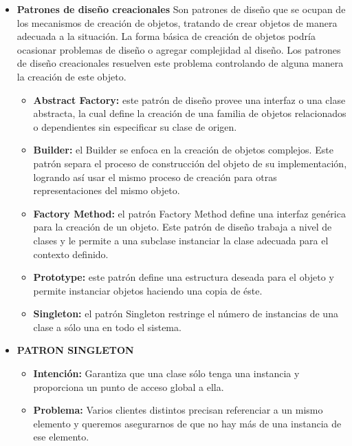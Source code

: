 \documentclass[twoside,twocolumn]{article}
\begin{document}
\begin{itemize}

    \item \textbf{Patrones de diseño creacionales} 
    Son patrones de diseño que se ocupan de los mecanismos de creación de objetos, tratando de crear objetos de manera adecuada a la situación. La forma básica de creación de objetos podría ocasionar problemas de diseño o agregar complejidad al diseño. Los patrones de diseño creacionales resuelven este problema controlando de alguna manera la creación de este objeto.
    \begin{itemize}
		\item \textbf{Abstract Factory:}	este patrón de diseño provee una interfaz o una clase abstracta, la cual define la creación de una familia de objetos relacionados o dependientes sin especificar su clase de origen. 
		\item \textbf{Builder:} el Builder se enfoca en la creación de objetos complejos. Este patrón separa el proceso de construcción del objeto de su implementación, logrando así usar el mismo proceso de creación para otras representaciones del mismo objeto.  
		\item \textbf{Factory Method:} el patrón Factory Method define una interfaz genérica para la creación de un objeto. Este patrón de diseño trabaja a nivel de clases y le permite a una subclase instanciar la clase adecuada para el contexto definido.  
		\item \textbf{Prototype:}	este patrón define una estructura deseada para el objeto y permite instanciar objetos haciendo una copia de éste.  
		\item \textbf{Singleton:} el patrón Singleton restringe el número de instancias de una clase a sólo una en todo el sistema. 
    \end{itemize}

	\item \textbf{PATRON SINGLETON}
	\begin{itemize}
		\item \textbf{Intención:}	Garantiza que una clase sólo tenga una instancia y proporciona un punto de acceso global a ella. 

		\item \textbf{Problema:} Varios clientes distintos precisan referenciar a un mismo elemento y queremos asegurarnos de que no hay más de una instancia de ese elemento. 


\end{itemize}
\end{itemize}
\end{document}
